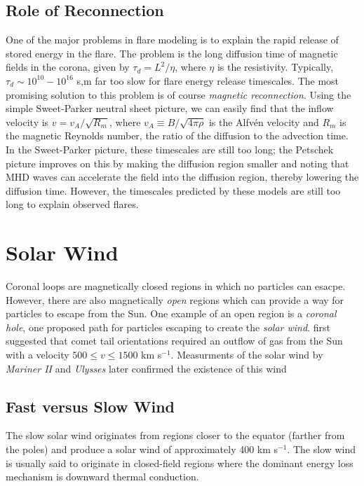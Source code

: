 	\subsection{Role of Reconnection}
	One of the major problems in flare modeling is to explain the rapid release of stored energy in the flare. The problem is the long diffusion time of magnetic fields in the corona, given by $\tau_d=L^2/\eta$, where $\eta$ is the resistivity. Typically, $\tau_d\sim10^{10}-10^{16}$ s,m far too slow for flare energy release timescales. The most promising solution to this problem is of course \textit{magnetic reconnection}. Using the simple Sweet-Parker neutral sheet picture, we can easily find that the inflow velocity is $v=v_A/\sqrt{R_m}$, where $v_A\equiv B/\sqrt{4\pi\rho}$ is the Alfv\'en velocity and $R_m$ is the magnetic Reynolds number, the ratio of the diffusion to the advection time. In the Sweet-Parker picture, these timescales are still too long; the Petschek picture improves on this by making the diffusion region smaller and noting that MHD waves can accelerate the field into the diffusion region, thereby lowering the diffusion time. However, the timescales predicted by these models are still too long to explain observed flares. 

\section{Solar Wind}
Coronal loops are magnetically closed regions in which no particles can esacpe. However, there are also magnetically \textit{open} regions which can provide a way for particles to escape from the Sun. One example of an open region is a \textit{coronal hole}, one proposed path for particles escaping to create the \textit{solar wind}. \citet{biermann_kometenschweife_1951} first suggested that comet tail orientations required an outflow of gas from the Sun with a velocity $500\le v\le 1500$ km s$^{-1}$. Measurments of the solar wind by \textit{Mariner II} and \textit{Ulysses} later confirmed the existence of this wind

	\subsection{Fast versus Slow Wind}
	The slow solar wind originates from regions closer to the equator (farther from the poles) and produce a solar wind of approximately 400 km s$^{-1}$. The slow wind is usually said to originate in closed-field regions where the dominant energy loss mechanism is downward thermal conduction. 

